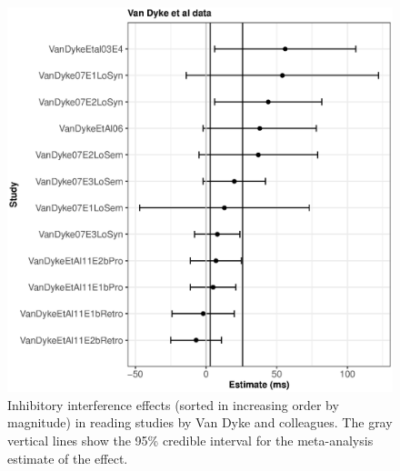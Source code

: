 \documentclass{cambridge7A}\usepackage[]{graphicx}\usepackage[]{color}
\makeatletter
\def\maxwidth{ %
  \ifdim\Gin@nat@width>\linewidth
    \linewidth
  \else
    \Gin@nat@width
  \fi
}
\newenvironment{knitrout}{}{} %
\makeatother
\begin{document}
\begin{figure}[!htbp]
\centering
\begin{knitrout}
\color{fgcolor}

{\centering \includegraphics[width=\maxwidth]{figures/fig-jvddataplot-1} 

}



\end{knitrout}
\caption{Inhibitory interference effects (sorted in increasing order by magnitude) in reading studies by Van Dyke and colleagues. The gray vertical lines show the 95\%  credible interval for the meta-analysis estimate  of the effect.}\label{fig:jvddataplot}
\end{figure}
\end{document}
